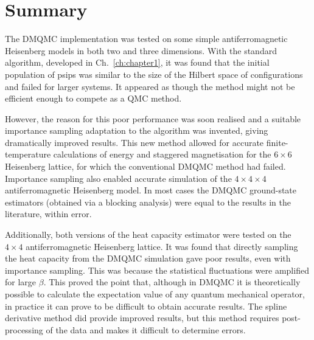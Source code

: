 \section{Summary}
The DMQMC implementation was tested on some simple antiferromagnetic Heisenberg models in both two and three dimensions. With the standard algorithm, developed in Ch.~\ref{ch:chapter1}, it was found that the initial population of psips was similar to the size of the Hilbert space of configurations and failed for larger systems. It appeared as though the method might not be efficient enough to compete as a QMC method. 

However, the reason for this poor performance was soon realised and a suitable importance sampling adaptation to the algorithm was invented, giving dramatically improved results. This new method allowed for accurate finite-temperature calculations of energy and staggered magnetisation for the $6\times6$ Heisenberg lattice, for which the conventional DMQMC method had failed. Importance sampling also enabled accurate simulation of the $4\times4\times4$ antiferromagnetic Heisenberg model. In most cases the DMQMC ground-state estimators (obtained via a blocking analysis) were equal to the results in the literature, within error.

Additionally, both versions of the heat capacity estimator were tested on the $4\times4$ antiferromagnetic Heisenberg lattice. It was found that directly sampling the heat capacity from the DMQMC simulation gave poor results, even with importance sampling. This was because the statistical fluctuations were amplified for large $\beta$. This proved the point that, although in DMQMC it is theoretically possible to calculate the expectation value of any quantum mechanical operator, in practice it can prove to be difficult to obtain accurate results. The spline derivative method did provide improved results, but this method requires post-processing of the data and makes it difficult to determine errors. 

